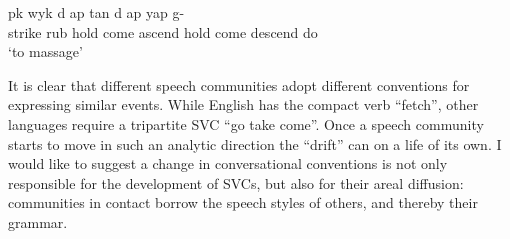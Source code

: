 \documentclass[output=paper]{langsci/langscibook}
\begin{document}
\ea
\label{ex:hyman:36}
\gll pk     wyk  d   ap  tan     d    ap   yap   g- \\
     strike rub hold come ascend hold come descend do\\
\glt  ‘to massage’
\z 

\noindent
It is clear that different speech communities adopt different conventions for expressing similar events. While English has the compact verb “fetch”, other languages require a tripartite SVC “go take come”. Once a speech community starts to move in such an analytic direction the “drift” can on a life of its own. I would like to suggest a change in conversational conventions is not only responsible for the development of SVCs, but also for their areal diffusion: communities in contact borrow the speech styles of others, and thereby their grammar.
\end{document}

